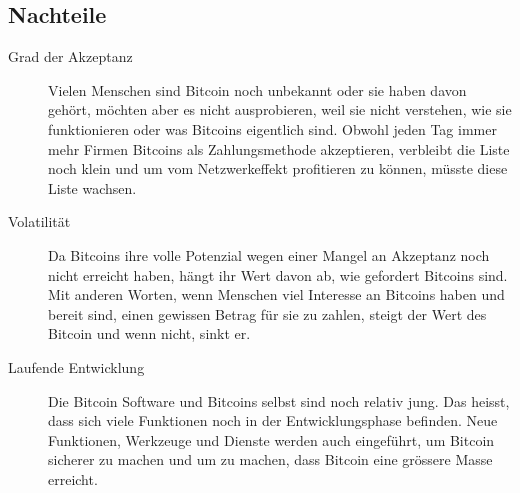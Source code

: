 \subsection*{Nachteile}

\begin{description}
  \item[Grad der Akzeptanz] Vielen Menschen sind Bitcoin noch unbekannt oder sie haben davon
  gehört, möchten aber es nicht ausprobieren, weil sie nicht verstehen, wie sie funktionieren
  oder was Bitcoins eigentlich sind. Obwohl jeden Tag immer mehr Firmen Bitcoins als Zahlungsmethode
  akzeptieren, verbleibt die Liste noch klein und um vom Netzwerkeffekt profitieren zu können, müsste
  diese Liste wachsen.
  \item[Volatilität] Da Bitcoins ihre volle Potenzial wegen einer Mangel an Akzeptanz noch nicht
  erreicht haben, hängt ihr Wert davon ab, wie gefordert Bitcoins sind. Mit anderen Worten, wenn Menschen
  viel Interesse an Bitcoins haben und bereit sind, einen gewissen Betrag für sie zu zahlen, steigt der
  Wert des Bitcoin und wenn nicht, sinkt er.
  \item[Laufende Entwicklung] Die Bitcoin Software und Bitcoins selbst sind noch relativ jung. Das heisst,
  dass sich viele Funktionen noch in der Entwicklungsphase befinden. Neue Funktionen, Werkzeuge und Dienste
  werden auch eingeführt, um Bitcoin sicherer zu machen und um zu machen, dass Bitcoin eine grössere Masse
  erreicht.

\end{description}
\newpage
